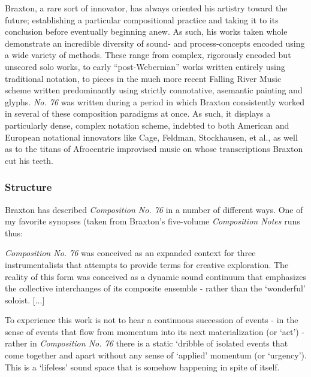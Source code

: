         Braxton, a rare sort of innovator, has always oriented his artistry toward the future; establishing a particular compositional practice and taking it to its conclusion before eventually beginning anew. As such, his works taken whole demonstrate an incredible diversity of sound- and process-concepts encoded using a wide variety of methods. These range from complex, rigorously encoded but unscored solo works, to early ``post-Webernian'' works written entirely using traditional notation, to pieces in the much more recent Falling River Music scheme written predominantly using strictly connotative, asemantic painting and glyphs. \textit{No. 76} was written during a period in which Braxton consistently worked in several of these composition paradigms at once. As such, it displays a particularly dense, complex notation scheme, indebted to both American and European notational innovators like Cage, Feldman, Stockhausen, et al., as well as to the titans of Afrocentric improvised music on whose transcriptions Braxton cut his teeth.

    \subsubsection{Structure}

        Braxton has described \textit{Composition No. 76} in a number of different ways. One of my favorite synopses (taken from Braxton's five-volume \textit{Composition Notes} runs thus:

        \begin{smallquote}
            \textit{Composition No. 76} was conceived as an expanded context for three instrumentalists that attempts to provide terms for creative exploration. The reality of this form was conceived as a dynamic sound continuum that emphasizes the collective interchanges of its composite ensemble - rather than the `wonderful' soloist. [...]

            \vspace{7pt}

            \noindent To experience this work is not to hear a continuous succession of events - in the sense of events that flow from momentum into its next materialization (or `act') - rather in \textit{Composition No. 76} there is a static `dribble of isolated events that come together and apart without any sense of `applied' momentum (or `urgency'). This is a `lifeless' sound space that is somehow happening in spite of itself.\autocite[145-8]{Braxton_1988}
        \end{smallquote}
    
